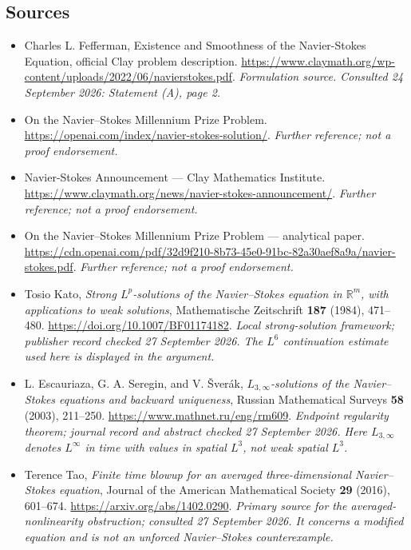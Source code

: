 \documentclass[11pt]{article}
\begin{document}
\subsection{Sources}
\begin{itemize}
\item[S1]Charles L. Fefferman, Existence and Smoothness of the Navier-Stokes Equation, official Clay problem description.
\url{https://www.claymath.org/wp-content/uploads/2022/06/navierstokes.pdf}.
\textit{Formulation source. Consulted 24 September 2026: Statement (A), page 2.}
\item[S2]On the Navier–Stokes Millennium Prize Problem.
\url{https://openai.com/index/navier-stokes-solution/}.
\textit{Further reference; not a proof endorsement.}
\item[S3]Navier-Stokes Announcement — Clay Mathematics Institute.
\url{https://www.claymath.org/news/navier-stokes-announcement/}.
\textit{Further reference; not a proof endorsement.}
\item[S4]On the Navier–Stokes Millennium Prize Problem — analytical paper.
\url{https://cdn.openai.com/pdf/32d9f210-8b73-45e0-91bc-82a30aef8a9a/navier-stokes.pdf}.
\textit{Further reference; not a proof endorsement.}
\item[E1]Tosio Kato, \emph{Strong $L^p$-solutions of the Navier--Stokes equation in $\mathbb R^m$, with applications to weak solutions}, Mathematische Zeitschrift \textbf{187} (1984), 471--480.
\url{https://doi.org/10.1007/BF01174182}.
\textit{Local strong-solution framework; publisher record checked 27 September 2026. The $L^6$ continuation estimate used here is displayed in the argument.}
\item[E2]L. Escauriaza, G. A. Seregin, and V. \v Sver\'ak, \emph{$L_{3,\infty}$-solutions of the Navier--Stokes equations and backward uniqueness}, Russian Mathematical Surveys \textbf{58} (2003), 211--250.
\url{https://www.mathnet.ru/eng/rm609}.
\textit{Endpoint regularity theorem; journal record and abstract checked 27 September 2026. Here $L_{3,\infty}$ denotes $L^\infty$ in time with values in spatial $L^3$, not weak spatial $L^3$.}
\item[E3]Terence Tao, \emph{Finite time blowup for an averaged three-dimensional Navier--Stokes equation}, Journal of the American Mathematical Society \textbf{29} (2016), 601--674.
\url{https://arxiv.org/abs/1402.0290}.
\textit{Primary source for the averaged-nonlinearity obstruction; consulted 27 September 2026. It concerns a modified equation and is not an unforced Navier--Stokes counterexample.}
\end{itemize}
\end{document}
